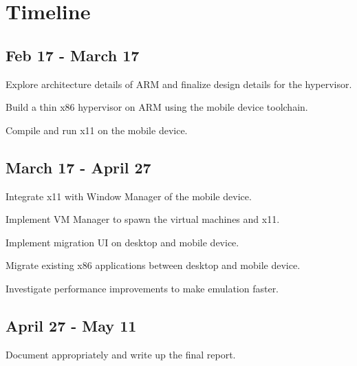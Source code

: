 \section{Timeline}
\subsection{Feb 17 - March 17}
	\begin{itemize*}
	\item Explore architecture details of ARM and finalize design details for the hypervisor.
	\item Build a thin x86 hypervisor on ARM using the mobile device toolchain.
	\item Compile and run x11 on the mobile device.
	\end{itemize*}
\subsection{March 17 - April 27}
	\begin{itemize*}
	\item Integrate x11 with Window Manager of the mobile device.
	\item Implement VM Manager to spawn the virtual machines and x11.
        \item Implement migration UI on desktop and mobile device.
        \item Migrate existing x86 applications between desktop and mobile device.
	\item Investigate performance improvements to make emulation faster.
	\end{itemize*}
\subsection{April 27 - May 11}
	\begin{itemize*}
	\item Document appropriately and write up the final report.
	\end{itemize*}
